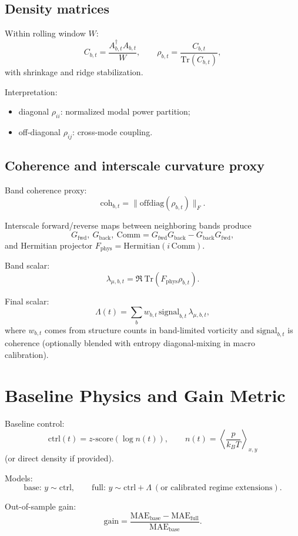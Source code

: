 \documentclass[11pt]{article}
\begin{document}
\subsection{Density matrices}
Within rolling window \(W\):
\[
C_{b,t}=\frac{A_{b,t}^\dagger A_{b,t}}{W},\qquad
\rho_{b,t}=\frac{C_{b,t}}{\mathrm{Tr}(C_{b,t})},
\]
with shrinkage and ridge stabilization.

Interpretation:
\begin{itemize}
  \item diagonal \(\rho_{ii}\): normalized modal power partition;
  \item off-diagonal \(\rho_{ij}\): cross-mode coupling.
\end{itemize}

\subsection{Coherence and interscale curvature proxy}
Band coherence proxy:
\[
\mathrm{coh}_{b,t}=\| \mathrm{offdiag}(\rho_{b,t})\|_F.
\]

Interscale forward/reverse maps between neighboring bands produce
\[
G_{\mathrm{fwd}},\ G_{\mathrm{back}},\ \mathrm{Comm}=G_{\mathrm{fwd}}G_{\mathrm{back}}-G_{\mathrm{back}}G_{\mathrm{fwd}},
\]
and Hermitian projector \(F_{\mathrm{phys}}=\mathrm{Hermitian}(i\,\mathrm{Comm})\).

Band scalar:
\[
\lambda_{\mu,b,t}=\Re\ \mathrm{Tr}(F_{\mathrm{phys}}\rho_{b,t}).
\]

Final scalar:
\[
\Lambda(t)=\sum_b w_{b,t}\,\mathrm{signal}_{b,t}\,\lambda_{\mu,b,t},
\]
where \(w_{b,t}\) comes from structure counts in band-limited vorticity and \(\mathrm{signal}_{b,t}\) is coherence (optionally blended with entropy diagonal-mixing in macro calibration).

\section{Baseline Physics and Gain Metric}
Baseline control:
\[
\mathrm{ctrl}(t)=z\text{-score}\left(\log n(t)\right),\qquad
n(t)=\left\langle \frac{p}{k_B T}\right\rangle_{x,y}
\]
(or direct density if provided).

Models:
\[
\text{base: } y\sim \mathrm{ctrl},
\qquad
\text{full: } y\sim \mathrm{ctrl}+\Lambda\ (\text{or calibrated regime extensions}).
\]

Out-of-sample gain:
\[
\mathrm{gain}=\frac{\mathrm{MAE}_{\mathrm{base}}-\mathrm{MAE}_{\mathrm{full}}}{\mathrm{MAE}_{\mathrm{base}}}.
\]
\end{document}
